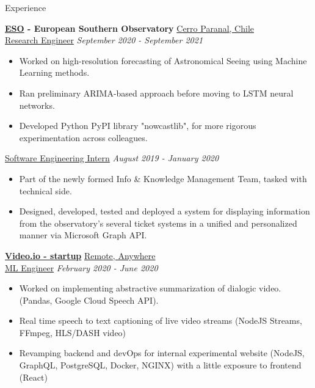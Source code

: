 \documentclass{resume} %
\begin{document}
\begin{rSection}{Experience}

	{\bf \href{https://www.eso.org}{ESO} - European Southern Observatory} \hfill \underline{Cerro Paranal, Chile}
	\\ \underline{Research Engineer} \hfill {\em September 2020 - September 2021}
	\begin{itemize}\vspace{-0.5em}
		\item Worked on high-resolution forecasting of Astronomical Seeing using Machine Learning
			methods.
		\item Ran preliminary ARIMA-based approach before moving to LSTM neural networks.
		\item Developed Python PyPI library "nowcastlib", for more rigorous experimentation across colleagues.
	\end{itemize}
	\underline{Software Engineering Intern} \hfill {\em August 2019 - January 2020}
	\begin{itemize}\vspace{-0.5em}
		\item Part of the newly formed Info \& Knowledge Management Team, tasked with technical side.
		\item Designed, developed, tested and deployed a system for displaying information from the observatory's several ticket systems in a unified and personalized manner via Microsoft Graph API.
	\end{itemize}

	{\bf \href{https://video.io/}{Video.io - startup}} \hfill \underline{Remote, Anywhere}
	\\ \underline{ML Engineer} \hfill {\em February 2020 - June 2020}
	\begin{itemize}\vspace{-0.5em}
		\item Worked on implementing abstractive summarization of dialogic video. (Pandas, Google Cloud Speech API).
		\item Real time speech to text captioning of live video streams (NodeJS Streams, FFmpeg, HLS/DASH video)
		\item Revamping backend and devOps for internal experimental website (NodeJS, GraphQL, PostgreSQL, Docker, NGINX) with a little exposure to frontend (React)
	\end{itemize}


\end{rSection}
\end{document}
